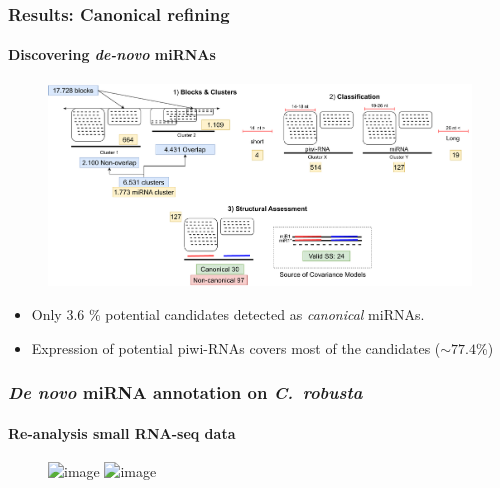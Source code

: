 \begin{frame}[t]
    \frametitle{Results: Canonical refining}
    \framesubtitle{Discovering \textit{de-novo} miRNAs}
    \begin{figure}[h!]
        \centering
        \includegraphics[width=\linewidth]{Figures/results_workflowALL}\label{fig:workflow} %
    \end{figure}
    \begin{itemize}
        \item Only $3.6$ \% potential candidates detected as \textit{canonical} miRNAs.
        \item Expression of potential piwi-RNAs covers most of the candidates ($\sim 77.4$\%)
    \end{itemize}
\end{frame}

\begin{frame}[t]
    \frametitle{\textit{De novo} miRNA annotation on \textit{C.\ robusta}}
    \framesubtitle{Re-analysis small RNA-seq data}
    \begin{figure}[h!]
        \centering
        \includegraphics<1>[width=\linewidth]{Figures/denovopositive} %
        \includegraphics<2>[width=\linewidth]{Figures/denovopositive2}\label{fig:synteny1497}
    \end{figure}
\end{frame}
